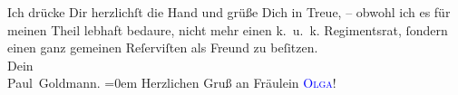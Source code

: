 \pstart
           Ich drücke Dir herzlichſt die \strikeout{\textcolor{gray}{H}} Hand und grüße Dich in Treue, – obwohl ich es für meinen Theil lebhaft
               bedaure, {\pb}nicht mehr einen k. u. k. Regimentsrat,
               ſondern einen ganz gemeinen Reſerviſten als Freund zu beſitzen. {\\[\baselineskip]}Dein {\\[\baselineskip]}\spacefill\mbox{Paul Goldmann.}\pend
           \leftskip=0em{}
\pstart
           \noindent{}Herzlichen Gruß an Fräulein \textsc{\textcolor{blue}{Olga}{}\ledrightnote{\textcolor{blue}{Olga Schnitzler}}}!\pend
           \endnumbering{}
\begin{anhang}
\end{anhang}
      